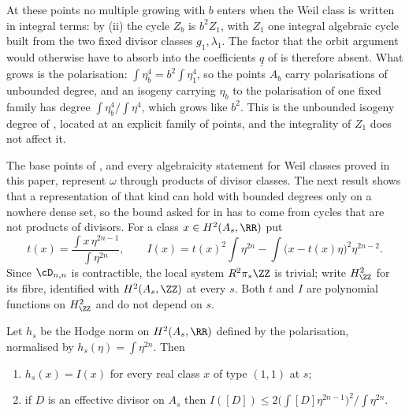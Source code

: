 \begin{remark}\label{rem:quatdivisible}
At these points no multiple growing with $b$ enters when the Weil class is
written in integral terms: by (ii) the cycle $Z_{b}$
is $b^{2}Z_{1}$, with $Z_{1}$ one integral algebraic cycle built from the two
fixed divisor classes $g_{1},\lambda_{1}$. The factor that the orbit argument
would otherwise have to absorb into the coefficients $\underline{q}$ of
 is therefore absent. What grows is the polarisation:
$\int\eta_{b}^{4}=b^{2}\int\eta_{1}^{4}$, so the points $A_{b}$ carry
polarisations of unbounded degree, and an isogeny carrying $\eta_{b}$ to the
polarisation of one fixed family has degree $\int\eta_{b}^{4}/\int\eta^{4}$,
which grows like $b^{2}$. This is the unbounded isogeny degree of
, located at an explicit family of points, and the
integrality of $Z_{1}$ does not affect it.
\end{remark}

The base points of , and every algebraicity statement
for Weil classes proved in this paper, represent $\omega$ through products of
divisor classes. The next result shows that a representation of that kind
can hold with bounded degrees only on a nowhere dense set, so the bound asked
for in  has to come from cycles that are not products of
divisors. For a class $x\in H^{2}(A_{s},\RR)$ put
\[
  t(x)=\frac{\int x\,\eta^{2n-1}}{\int\eta^{2n}},\qquad
  I(x)=t(x)^{2}\!\int\eta^{2n}-\int\bigl(x-t(x)\eta\bigr)^{2}\eta^{2n-2}.
\]
Since $\cD_{n,n}$ is contractible, the local system $R^{2}\pi_{*}\ZZ$ is
trivial; write $H^{2}_{\ZZ}$ for its fibre, identified with $H^{2}(A_{s},\ZZ)$
at every $s$. Both $t$ and $I$ are polynomial functions on $H^{2}_{\ZZ}$ and
do not depend on $s$.

\begin{lemma}\label{lem:nefnorm}
Let $h_{s}$ be the Hodge norm on $H^{2}(A_{s},\RR)$ defined by the
polarisation, normalised by $h_{s}(\eta)=\int\eta^{2n}$. Then
\begin{enumerate}[label=\textup{(\roman*)},nosep]
\item $h_{s}(x)=I(x)$ for every real class $x$ of type $(1,1)$ at $s$;
\item if $D$ is an effective divisor on $A_{s}$ then
  $I([D])\le 2\bigl(\int[D]\eta^{2n-1}\bigr)^{2}\big/\!\int\eta^{2n}$.
\end{enumerate}
\end{lemma}

